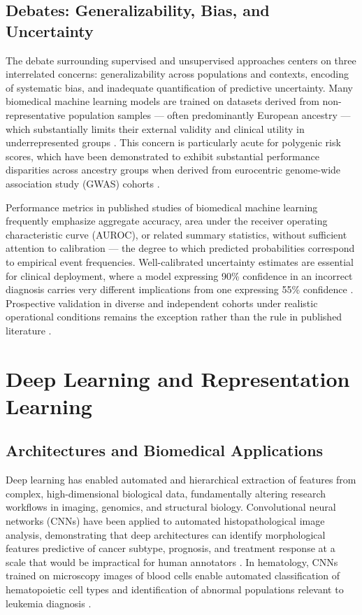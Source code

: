 \subsection{Debates: Generalizability, Bias, and Uncertainty}

The debate surrounding supervised and unsupervised approaches centers on three interrelated concerns: generalizability across populations and contexts, encoding of systematic bias, and inadequate quantification of predictive uncertainty. Many biomedical machine learning models are trained on datasets derived from non-representative population samples --- often predominantly European ancestry --- which substantially limits their external validity and clinical utility in underrepresented groups \parencite{popejoy2016, obermeyer2019}. This concern is particularly acute for polygenic risk scores, which have been demonstrated to exhibit substantial performance disparities across ancestry groups when derived from eurocentric genome-wide association study (GWAS) cohorts \parencite{martin2019}.

Performance metrics in published studies of biomedical machine learning frequently emphasize aggregate accuracy, area under the receiver operating characteristic curve (AUROC), or related summary statistics, without sufficient attention to calibration --- the degree to which predicted probabilities correspond to empirical event frequencies. Well-calibrated uncertainty estimates are essential for clinical deployment, where a model expressing 90\% confidence in an incorrect diagnosis carries very different implications from one expressing 55\% confidence \parencite{guo2017}. Prospective validation in diverse and independent cohorts under realistic operational conditions remains the exception rather than the rule in published literature \parencite{wynants2020}.

\section{Deep Learning and Representation Learning}

\subsection{Architectures and Biomedical Applications}

Deep learning has enabled automated and hierarchical extraction of features from complex, high-dimensional biological data, fundamentally altering research workflows in imaging, genomics, and structural biology. Convolutional neural networks (CNNs) have been applied to automated histopathological image analysis, demonstrating that deep architectures can identify morphological features predictive of cancer subtype, prognosis, and treatment response at a scale that would be impractical for human annotators \parencite{esteva2017, kather2019}. In hematology, CNNs trained on microscopy images of blood cells enable automated classification of hematopoietic cell types and identification of abnormal populations relevant to leukemia diagnosis \parencite{matek2019}.

